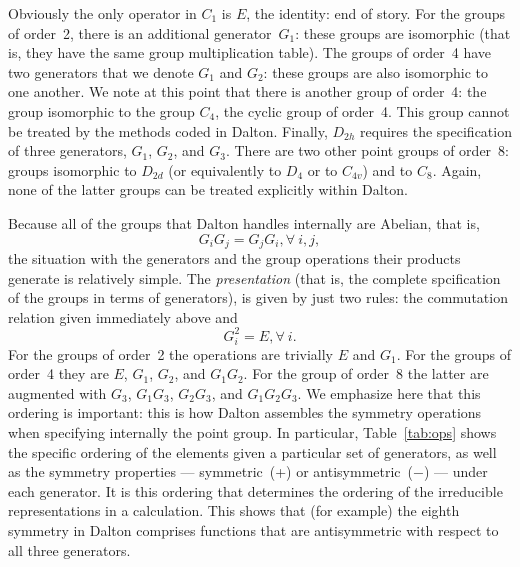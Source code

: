 Obviously the only operator in $C_1$ is $E$, the identity: end of
story.  For the groups of order~2, there is an additional
generator~$G_1$: these groups are isomorphic (that is, they have the
same group multiplication table).  The groups of order~4 have two
generators that we denote $G_1$ and $G_2$: these groups are also
isomorphic to one another.  We note at this point that there is
another group of order~4: the
group isomorphic to the group $C_4$, the cyclic group of order~4.
This group cannot be treated by the methods coded
in Dalton.  Finally, $D_{2h}$ requires the specification of three
generators, $G_1$, $G_2$, and $G_3$.  There are two other point groups
of order~8: groups isomorphic to $D_{2d}$ (or equivalently to
$D_4$ or to $C_{4v}$) and to $C_8$.
Again, none of the latter groups can be treated explicitly within
Dalton.

Because all of the groups that Dalton handles internally are Abelian,
that is,
\begin{displaymath}
  G_i G_j = G_j G_i, \forall\ i,j,
\end{displaymath}
the situation with the generators and the group operations their
products generate is relatively simple.  The \emph{presentation} (that
is, the complete spcification of the groups in terms of generators),
is given by just two rules: the commutation relation given immediately
above and
\begin{displaymath}
  G_i^2 = E, \forall\ i.
\end{displaymath}
For the
groups of order~2 the operations are trivially $E$ and $G_1$.  For the
groups of order~4 they are $E$, $G_1$, $G_2$, and $G_1G_2$.  For the
group of order~8 the latter are augmented with $G_3$, $G_1G_3$,
$G_2G_3$, and $G_1G_2G_3$.  We emphasize here that this ordering is
important: this is how Dalton assembles the symmetry operations when
specifying internally the point group.  In particular,
Table~\ref{tab:ops} shows the specific ordering of the elements given
a particular set of generators, as well as the symmetry properties ---
symmetric~(+) or antisymmetric~($-$) --- under each generator.  It is
this ordering that determines the ordering of the irreducible
representations in a calculation.  This shows that (for example) the
eighth symmetry in Dalton comprises functions that are antisymmetric
with respect to all three generators.

